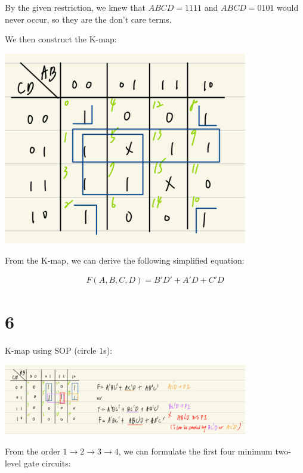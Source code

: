\documentclass{article}
\begin{document}
By the given restriction, we knew that $ABCD = 1111$ and $ABCD = 0101$ would never occur, so they are the don't care terms.
\bigskip

We then construct the K-map:

\begin{center}
    \includegraphics[width=0.8\textwidth]{HW2_5_KMap}
\end{center}

From the K-map, we can derive the following simplified equation:

\begin{align*}
    F(A, B, C, D) = B'D' + A'D + C'D
\end{align*}
\newpage

\section*{6}

K-map using SOP (circle $1$s):

\begin{center}
    \includegraphics[width=0.8\textwidth]{HW2_6_SOP_KMap}
\end{center}

From the order $1 \rightarrow 2 \rightarrow 3 \rightarrow 4$, we can formulate the first four minimum two-level gate circuits:
\end{document}
